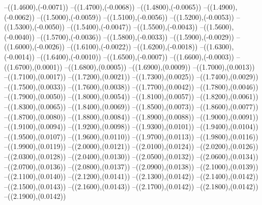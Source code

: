 {	--({\sx*(1.4600)},{\sy*(-0.0071)})
	--({\sx*(1.4700)},{\sy*(-0.0068)})
	--({\sx*(1.4800)},{\sy*(-0.0065)})
	--({\sx*(1.4900)},{\sy*(-0.0062)})
	--({\sx*(1.5000)},{\sy*(-0.0059)})
	--({\sx*(1.5100)},{\sy*(-0.0056)})
	--({\sx*(1.5200)},{\sy*(-0.0053)})
	--({\sx*(1.5300)},{\sy*(-0.0050)})
	--({\sx*(1.5400)},{\sy*(-0.0047)})
	--({\sx*(1.5500)},{\sy*(-0.0043)})
	--({\sx*(1.5600)},{\sy*(-0.0040)})
	--({\sx*(1.5700)},{\sy*(-0.0036)})
	--({\sx*(1.5800)},{\sy*(-0.0033)})
	--({\sx*(1.5900)},{\sy*(-0.0029)})
	--({\sx*(1.6000)},{\sy*(-0.0026)})
	--({\sx*(1.6100)},{\sy*(-0.0022)})
	--({\sx*(1.6200)},{\sy*(-0.0018)})
	--({\sx*(1.6300)},{\sy*(-0.0014)})
	--({\sx*(1.6400)},{\sy*(-0.0010)})
	--({\sx*(1.6500)},{\sy*(-0.0007)})
	--({\sx*(1.6600)},{\sy*(-0.0003)})
	--({\sx*(1.6700)},{\sy*(0.0001)})
	--({\sx*(1.6800)},{\sy*(0.0005)})
	--({\sx*(1.6900)},{\sy*(0.0009)})
	--({\sx*(1.7000)},{\sy*(0.0013)})
	--({\sx*(1.7100)},{\sy*(0.0017)})
	--({\sx*(1.7200)},{\sy*(0.0021)})
	--({\sx*(1.7300)},{\sy*(0.0025)})
	--({\sx*(1.7400)},{\sy*(0.0029)})
	--({\sx*(1.7500)},{\sy*(0.0033)})
	--({\sx*(1.7600)},{\sy*(0.0038)})
	--({\sx*(1.7700)},{\sy*(0.0042)})
	--({\sx*(1.7800)},{\sy*(0.0046)})
	--({\sx*(1.7900)},{\sy*(0.0050)})
	--({\sx*(1.8000)},{\sy*(0.0054)})
	--({\sx*(1.8100)},{\sy*(0.0057)})
	--({\sx*(1.8200)},{\sy*(0.0061)})
	--({\sx*(1.8300)},{\sy*(0.0065)})
	--({\sx*(1.8400)},{\sy*(0.0069)})
	--({\sx*(1.8500)},{\sy*(0.0073)})
	--({\sx*(1.8600)},{\sy*(0.0077)})
	--({\sx*(1.8700)},{\sy*(0.0080)})
	--({\sx*(1.8800)},{\sy*(0.0084)})
	--({\sx*(1.8900)},{\sy*(0.0088)})
	--({\sx*(1.9000)},{\sy*(0.0091)})
	--({\sx*(1.9100)},{\sy*(0.0094)})
	--({\sx*(1.9200)},{\sy*(0.0098)})
	--({\sx*(1.9300)},{\sy*(0.0101)})
	--({\sx*(1.9400)},{\sy*(0.0104)})
	--({\sx*(1.9500)},{\sy*(0.0107)})
	--({\sx*(1.9600)},{\sy*(0.0110)})
	--({\sx*(1.9700)},{\sy*(0.0113)})
	--({\sx*(1.9800)},{\sy*(0.0116)})
	--({\sx*(1.9900)},{\sy*(0.0119)})
	--({\sx*(2.0000)},{\sy*(0.0121)})
	--({\sx*(2.0100)},{\sy*(0.0124)})
	--({\sx*(2.0200)},{\sy*(0.0126)})
	--({\sx*(2.0300)},{\sy*(0.0128)})
	--({\sx*(2.0400)},{\sy*(0.0130)})
	--({\sx*(2.0500)},{\sy*(0.0132)})
	--({\sx*(2.0600)},{\sy*(0.0134)})
	--({\sx*(2.0700)},{\sy*(0.0136)})
	--({\sx*(2.0800)},{\sy*(0.0137)})
	--({\sx*(2.0900)},{\sy*(0.0138)})
	--({\sx*(2.1000)},{\sy*(0.0139)})
	--({\sx*(2.1100)},{\sy*(0.0140)})
	--({\sx*(2.1200)},{\sy*(0.0141)})
	--({\sx*(2.1300)},{\sy*(0.0142)})
	--({\sx*(2.1400)},{\sy*(0.0142)})
	--({\sx*(2.1500)},{\sy*(0.0143)})
	--({\sx*(2.1600)},{\sy*(0.0143)})
	--({\sx*(2.1700)},{\sy*(0.0142)})
	--({\sx*(2.1800)},{\sy*(0.0142)})
	--({\sx*(2.1900)},{\sy*(0.0142)})
}
